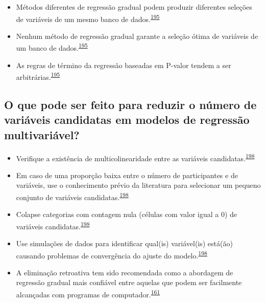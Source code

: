 \documentclass[
  a4paper,
]{book}
\begin{document}
\begin{itemize}
\item
  Métodos diferentes de regressão gradual podem produzir diferentes seleções de variáveis de um mesmo banco de dados.\textsuperscript{\protect\hyperlink{ref-Healy1995}{195}}
\item
  Nenhum método de regressão gradual garante a seleção ótima de variáveis de um banco de dados.\textsuperscript{\protect\hyperlink{ref-Healy1995}{195}}
\item
  As regras de término da regressão baseadas em P-valor tendem a ser arbitrárias.\textsuperscript{\protect\hyperlink{ref-Healy1995}{195}}
\end{itemize}

\hypertarget{o-que-pode-ser-feito-para-reduzir-o-nuxfamero-de-variuxe1veis-candidatas-em-modelos-de-regressuxe3o-multivariuxe1vel}{%
\subsection{O que pode ser feito para reduzir o número de variáveis candidatas em modelos de regressão multivariável?}\label{o-que-pode-ser-feito-para-reduzir-o-nuxfamero-de-variuxe1veis-candidatas-em-modelos-de-regressuxe3o-multivariuxe1vel}}

\begin{itemize}
\item
  Verifique a existência de multicolinearidade entre as variáveis candidatas.\textsuperscript{\protect\hyperlink{ref-Sun1996}{198}}
\item
  Em caso de uma proporção baixa entre o número de participantes e de variáveis, use o conhecimento prévio da literatura para selecionar um pequeno conjunto de variáveis candidatas.\textsuperscript{\protect\hyperlink{ref-Sun1996}{198}}
\item
  Colapse categorias com contagem nula (células com valor igual a 0) de variáveis candidatas.\textsuperscript{\protect\hyperlink{ref-Sun1996}{198}}
\item
  Use simulações de dados para identificar qual(is) variável(is) está(ão) causando problemas de convergência do ajuste do modelo.\textsuperscript{\protect\hyperlink{ref-Sun1996}{198}}
\item
  A eliminação retroativa tem sido recomendada como a abordagem de regressão gradual mais confiável entre aquelas que podem ser facilmente alcançadas com programas de computador.\textsuperscript{\protect\hyperlink{ref-heinze2016}{161}}
\end{itemize}
\end{document}

